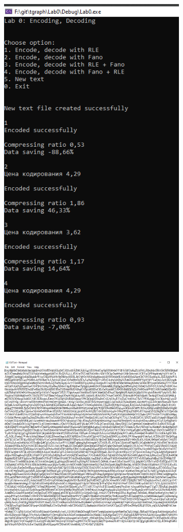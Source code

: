 \documentclass[12pt]{article} %
\begin{document}
 \begin{figure}[H]
\centering
\begin{subfigure}
\centering
 \includegraphics[scale = 0.5]{coded.png}
\end{subfigure}
\hfill
\begin{subfigure}
\centering 
\includegraphics[scale = 0.3]{out.png}

\end{subfigure}
\end{figure}
\end{document}
